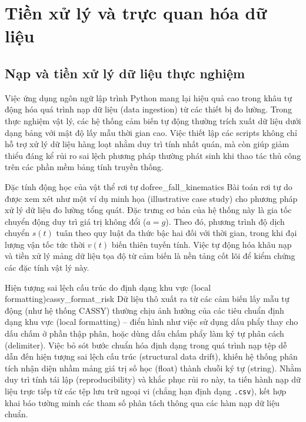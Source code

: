 \chapter{Tiền xử lý và trực quan hóa dữ liệu}
\section{Nạp và tiền xử lý dữ liệu thực nghiệm}

Việc ứng dụng ngôn ngữ lập trình Python mang lại hiệu quả cao trong khâu tự động hóa quá trình nạp dữ liệu (data ingestion) từ các thiết bị đo lường. Trong thực nghiệm vật lý, các hệ thống cảm biến tự động thường trích xuất dữ liệu dưới dạng bảng với mật độ lấy mẫu thời gian cao. Việc thiết lập các scripts không chỉ hỗ trợ xử lý dữ liệu hàng loạt nhằm duy trì tính nhất quán, mà còn giúp giảm thiểu đáng kể rủi ro sai lệch phương pháp thường phát sinh khi thao tác thủ công trên các phần mềm bảng tính truyền thống.

\begin{physcore}{Đặc tính động học của vật thể rơi tự do}{free_fall_kinematics}
Bài toán rơi tự do được xem xét như một ví dụ minh họa (illustrative case study) cho phương pháp xử lý dữ liệu đo lường tổng quát. Đặc trưng cơ bản của hệ thống này là gia tốc chuyển động duy trì giá trị không đổi ($a = g$). Theo đó, phương trình độ dịch chuyển $s(t)$ tuân theo quy luật đa thức bậc hai đối với thời gian, trong khi đại lượng vận tốc tức thời $v(t)$ biến thiên tuyến tính. Việc tự động hóa khâu nạp và tiền xử lý mảng dữ liệu tọa độ từ cảm biến là nền tảng cốt lõi để kiểm chứng các đặc tính vật lý này.
\end{physcore}

\begin{pitfall}{Hiện tượng sai lệch cấu trúc do định dạng khu vực (local formatting)}{cassy_format_risk}
Dữ liệu thô xuất ra từ các cảm biến lấy mẫu tự động (như hệ thống CASSY) thường chịu ảnh hưởng của các tiêu chuẩn định dạng khu vực (local formatting) – điển hình như việc sử dụng dấu phẩy thay cho dấu chấm ở phần thập phân, hoặc dùng dấu chấm phẩy làm ký tự phân cách (delimiter). Việc bỏ sót bước chuẩn hóa định dạng trong quá trình nạp tệp dễ dẫn đến hiện tượng sai lệch cấu trúc (structural data drift), khiến hệ thống phân tích nhận diện nhầm mảng giá trị số học (float) thành chuỗi ký tự (string). Nhằm duy trì tính tái lập (reproducibility) và khắc phục rủi ro này, ta tiến hành nạp dữ liệu trực tiếp từ các tệp lưu trữ ngoại vi (chẳng hạn định dạng \texttt{.csv}), kết hợp khai báo tường minh các tham số phân tách thông qua các hàm nạp dữ liệu chuẩn.
\end{pitfall}

